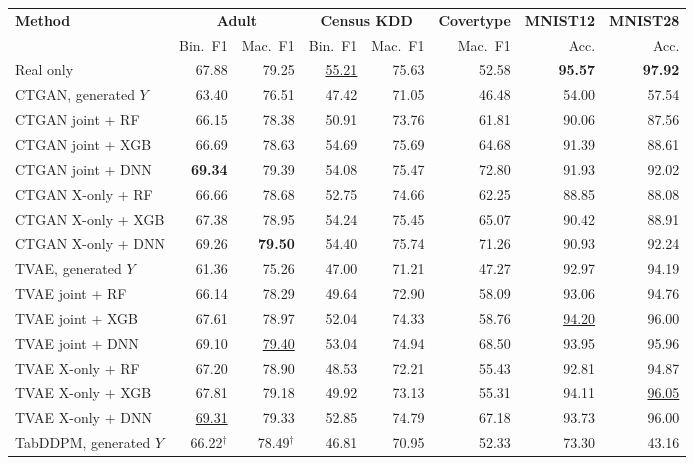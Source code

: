 \begin{table}[p]
\centering
\footnotesize
\setlength{\tabcolsep}{6pt}
\begin{tabular}{@{}lrrrrrrr@{}}
\toprule
\textbf{Method} & \multicolumn{2}{c}{\textbf{Adult}} & \multicolumn{2}{c}{\textbf{Census KDD}} & \multicolumn{1}{c}{\textbf{Covertype}} & \multicolumn{1}{c}{\textbf{MNIST12}} & \multicolumn{1}{c}{\textbf{MNIST28}} \\
\cmidrule(lr){2-3}\cmidrule(lr){4-5}\cmidrule(lr){6-6}\cmidrule(lr){7-7}\cmidrule(lr){8-8}
 & Bin.\ F1 & Mac.\ F1 & Bin.\ F1 & Mac.\ F1 & Mac.\ F1 & Acc. & Acc. \\
\midrule
Real only & 67.88 & 79.25 & \underline{55.21} & 75.63 & 52.58 & \textbf{95.57} & \textbf{97.92} \\
\midrule
CTGAN, generated $Y$ & 63.40 & 76.51 & 47.42 & 71.05 & 46.48 & 54.00 & 57.54 \\
CTGAN joint + RF & 66.15 & 78.38 & 50.91 & 73.76 & 61.81 & 90.06 & 87.56 \\
CTGAN joint + XGB & 66.69 & 78.63 & 54.69 & 75.69 & 64.68 & 91.39 & 88.61 \\
CTGAN joint + DNN & \textbf{69.34} & 79.39 & 54.08 & 75.47 & 72.80 & 91.93 & 92.02 \\
CTGAN X-only + RF & 66.66 & 78.68 & 52.75 & 74.66 & 62.25 & 88.85 & 88.08 \\
CTGAN X-only + XGB & 67.38 & 78.95 & 54.24 & 75.45 & 65.07 & 90.42 & 88.91 \\
CTGAN X-only + DNN & 69.26 & \textbf{79.50} & 54.40 & 75.74 & 71.26 & 90.93 & 92.24 \\
\addlinespace
TVAE, generated $Y$ & 61.36 & 75.26 & 47.00 & 71.21 & 47.27 & 92.97 & 94.19 \\
TVAE joint + RF & 66.14 & 78.29 & 49.64 & 72.90 & 58.09 & 93.06 & 94.76 \\
TVAE joint + XGB & 67.61 & 78.97 & 52.04 & 74.33 & 58.76 & \underline{94.20} & 96.00 \\
TVAE joint + DNN & 69.10 & \underline{79.40} & 53.04 & 74.94 & 68.50 & 93.95 & 95.96 \\
TVAE X-only + RF & 67.20 & 78.90 & 48.53 & 72.21 & 55.43 & 92.81 & 94.87 \\
TVAE X-only + XGB & 67.81 & 79.18 & 49.92 & 73.13 & 55.31 & 94.11 & \underline{96.05} \\
TVAE X-only + DNN & \underline{69.31} & 79.33 & 52.85 & 74.79 & 67.18 & 93.73 & 96.00 \\
\addlinespace
TabDDPM, generated $Y$ & 66.22$^{\dagger}$ & 78.49$^{\dagger}$ & 46.81 & 70.95 & 52.33 & 73.30 & 43.16 \\

\end{tabular}
\end{table}
